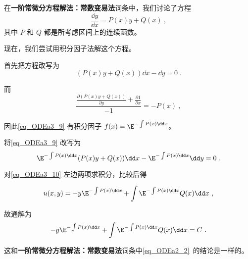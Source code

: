 \begin{example}{}
在\textbf{一阶常微分方程解法：常数变易法}词条中，我们讨论了方程
\begin{equation}
\frac{\dd y}{\dd x}=P(x)y+Q(x)~,
\end{equation}
其中 $P$ 和 $Q$ 都是所考虑区间上的连续函数。

现在，我们尝试用积分因子法解这个方程。

首先把方程改写为
\begin{equation}\label{eq_ODEa3_9}
(P(x)y+Q(x))\dd x-\dd y=0~.
\end{equation}

而
\begin{equation}
\frac{\frac{\partial (P(x)y+Q(x))}{\partial y}+\frac{\partial 1}{\partial x}}{-1}=-P(x)~,
\end{equation}

因此\autoref{eq_ODEa3_9} 有积分因子 $f(x)=\E^{-\int P(x)\dd x}
$。

将\autoref{eq_ODEa3_9} 改写为
\begin{equation}\label{eq_ODEa3_10}
\E^{-\int P(x)\dd x}(P(x)y+Q(x))\dd x-\E^{-\int P(x)\dd x}\dd y=0~.
\end{equation}

对\autoref{eq_ODEa3_10} 左边两项求积分，比较后得

\begin{equation}
u(x, y)=-y\E^{-\int P(x)\dd x}+\int  \E^{-\int P(x)\dd x}Q(x)  \dd x~,
\end{equation}

故通解为
\begin{equation}
-y\E^{-\int P(x)\dd x}+\int  \E^{-\int P(x)\dd x}Q(x)  \dd x=C~.
\end{equation}

这和\textbf{一阶常微分方程解法：常数变易法}词条中\autoref{eq_ODEa2_2}~的结论是一样的。

\end{example}














